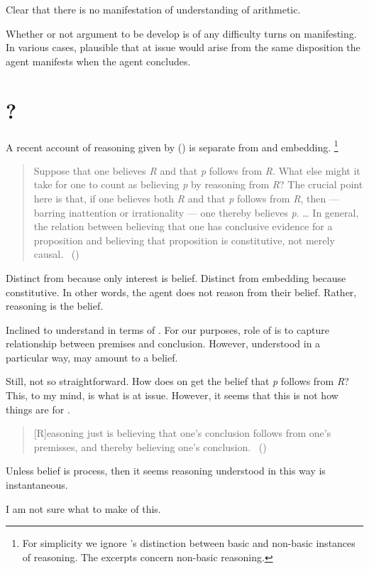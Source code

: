 \begin{note}[Illustration]
  Clear that there is no manifestation of understanding of arithmetic.
\end{note}

\begin{note}
  Whether or not argument to be develop is of any difficulty turns on manifesting.
  In various cases, plausible that  at issue would arise from the same disposition the agent manifests when the agent concludes.
\end{note}

\section{?}

\begin{note}
  A recent account of reasoning given by \cite{Valaris:2014un} (\citeyear{Valaris:2014un}) is separate from \wit{} and embedding.%
  \footnote{
    For simplicity we ignore \citeauthor{Valaris:2014un}'s distinction between basic and non-basic instances of reasoning.
    The excerpts concern non-basic reasoning.
  }

    \begin{quote}
    Suppose that one believes \emph{R} and that \emph{p} follows from \emph{R}.
    What else might it take for one to count as believing \emph{p} by reasoning from \emph{R}?
    The crucial point here is that, if one believes both \emph{R} and that \emph{p} follows from \emph{R}, then --- barring inattention or irrationality --- one thereby believes \emph{p}.
    \dots
    In general, the relation between believing that one has conclusive evidence for a proposition and believing that proposition is constitutive, not merely causal.%
    \mbox{ }\hfill\mbox{(\citeyear[110 ]{Valaris:2014un})}
  \end{quote}

  Distinct from \wit{} because only interest is belief.
  Distinct from embedding because constitutive.
  In other words, the agent does not reason from their belief.
  Rather, reasoning is the belief.

  Inclined to understand in terms of \ros{}.
  For our purposes, role of \ros{} is to capture relationship between premises and conclusion.
  However, understood in a particular way, may amount to a belief.

  Still, not so straightforward.
  How does on get the belief that \emph{p} follows from \emph{R}?
  This, to my mind, is what is at issue.
  However, it seems that this is not how things are for \citeauthor{Valaris:2014un}.

  \begin{quote}
    [R]easoning just is believing that one's conclusion follows from one's premisses, and thereby believing one's conclusion.%
    \mbox{ }\hfill\mbox{(\citeyear[112]{Valaris:2014un})}
  \end{quote}

  Unless belief is process, then it seems reasoning understood in this way is instantaneous.

  I am not sure what to make of this.
\end{note}

